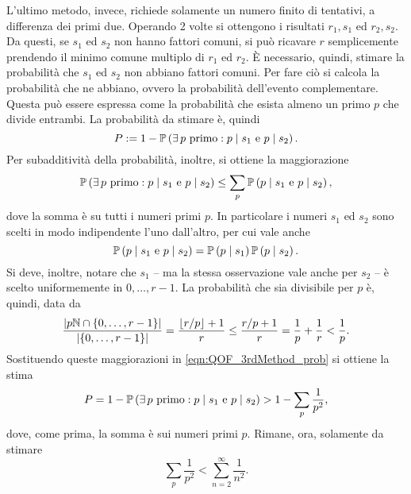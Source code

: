 L'ultimo metodo, invece, richiede solamente un numero finito di tentativi, a differenza dei primi due. 
Operando 2 volte si ottengono i risultati $r_1, s_1$ ed $r_2, s_2$.
Da questi, se $s_1$ ed $s_2$ non hanno fattori comuni, si può ricavare $r$ semplicemente prendendo il minimo comune multiplo di $r_1$ ed $r_2$.
È necessario, quindi, stimare la probabilità che $s_1$ ed $s_2$ non abbiano fattori comuni.
Per fare ciò si calcola la probabilità che ne abbiano, ovvero la probabilità dell'evento complementare.
Questa può essere espressa come la probabilità che esista almeno un primo $p$ che divide entrambi.
La probabilità da stimare è, quindi
\begin{equation}\label{eqn:QOF_3rdMethod_prob}
 P := 1 - \P\left(\exists\, p \text{ primo} : p \mid s_1 \text{ e } p \mid s_2\right).
\end{equation}
Per subadditività della probabilità, inoltre, si ottiene la maggiorazione
\begin{equation}
  \P\left(\exists\, p \text{ primo} : p \mid s_1 \text{ e } p \mid s_2\right) \leq \sum_{p}  \P\left(p \mid s_1 \text{ e } p \mid s_2\right),
\end{equation}
dove la somma è su tutti i numeri primi $p$.
In particolare i numeri $s_1$ ed $s_2$ sono scelti in modo indipendente l'uno dall'altro, per cui vale anche
\begin{equation}
  \P\left(p \mid s_1 \text{ e } p \mid s_2\right) = \P\left(p \mid s_1 \right) \P\left(p \mid s_2\right).
\end{equation}
Si deve, inoltre, notare che $s_1$ -- ma la stessa osservazione vale anche per $s_2$ -- è scelto uniformemente in $0, \dots, r-1$.
La probabilità che sia divisibile per $p$ è, quindi, data da
\begin{equation}
 \frac{\left|p\N \cap \left\{0, \dots, r-1\right\}\right|}{\left|\left\{0, \dots, r-1\right\}\right|} = \frac{\lfloor r/p \rfloor + 1}{r} \leq \frac{r/p + 1}{r} = \frac{1}{p} + \frac{1}{r} < \frac{1}{p}.
\end{equation}
Sostituendo queste maggiorazioni in \eqref{eqn:QOF_3rdMethod_prob} si ottiene la stima
\begin{equation}\label{eqn:QOF_3rdMethod_stima_parz}
 P = 1 - \P\left(\exists\, p \text{ primo} : p \mid s_1 \text{ e } p \mid s_2\right) > 1 - \sum_{p} \frac{1}{p^2},
\end{equation}
dove, come prima, la somma è sui numeri primi $p$.
Rimane, ora, solamente da stimare 
\begin{equation}\label{eqn:QOF_3rdMethod_stima_ultima}
 \sum_{p} \frac{1}{p^2} < \sum_{n=2}^\infty \frac{1}{n^2}.
\end{equation}
